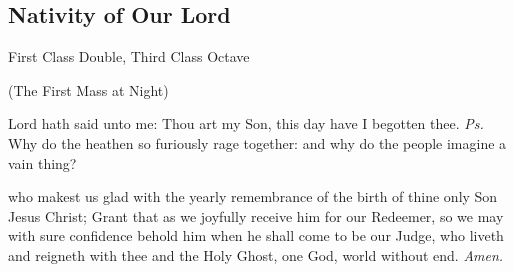 \subsection{Nativity of Our Lord}
\begin{inhead}
{First Class Double, Third Class Octave}
\end{inhead}
\begin{inhead}
	(The First Mass at Night)
\end{inhead}

\introit
{} Lord hath said unto me: Thou art my Son, this day have I begotten thee. \textit{Ps.} Why do the heathen so furiously rage together: and why do the people imagine a vain thing?

\collect
{} who makest us glad with the yearly remembrance of the birth of thine only Son Jesus Christ; Grant that as we joyfully receive him for our Redeemer, so we may with sure confidence behold him when he shall come to be our Judge, who liveth and reigneth with thee and the Holy Ghost, one God, world without end. \textit{Amen.}

